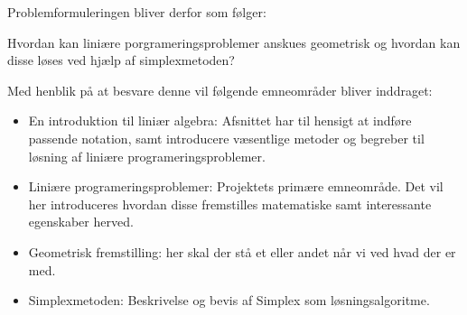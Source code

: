 Problemformuleringen bliver derfor som følger:
\begin{col}{}{}
Hvordan kan liniære porgrameringsproblemer anskues geometrisk og hvordan kan disse løses ved hjælp af simplexmetoden?
\end{col}
Med henblik på at besvare denne vil følgende emneområder bliver inddraget:
\begin{itemize}
\item En introduktion til liniær algebra: Afsnittet har til hensigt at indføre passende notation, samt introducere væsentlige metoder og begreber til løsning af liniære programeringsproblemer.
\item Liniære programeringsproblemer: Projektets primære emneområde. Det vil her introduceres hvordan disse fremstilles matematiske samt interessante egenskaber herved.
\item Geometrisk fremstilling: her skal der stå et eller andet når vi ved hvad der er med.
\item Simplexmetoden: Beskrivelse og bevis af Simplex som løsningsalgoritme.
\end{itemize}